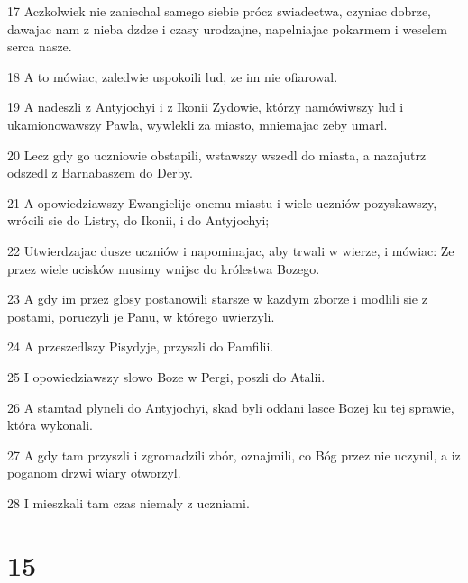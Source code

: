 \par 17 Aczkolwiek nie zaniechal samego siebie prócz swiadectwa, czyniac dobrze, dawajac nam z nieba dzdze i czasy urodzajne, napelniajac pokarmem i weselem serca nasze.
\par 18 A to mówiac, zaledwie uspokoili lud, ze im nie ofiarowal.
\par 19 A nadeszli z Antyjochyi i z Ikonii Zydowie, którzy namówiwszy lud i ukamionowawszy Pawla, wywlekli za miasto, mniemajac zeby umarl.
\par 20 Lecz gdy go uczniowie obstapili, wstawszy wszedl do miasta, a nazajutrz odszedl z Barnabaszem do Derby.
\par 21 A opowiedziawszy Ewangielije onemu miastu i wiele uczniów pozyskawszy, wrócili sie do Listry, do Ikonii, i do Antyjochyi;
\par 22 Utwierdzajac dusze uczniów i napominajac, aby trwali w wierze, i mówiac: Ze przez wiele ucisków musimy wnijsc do królestwa Bozego.
\par 23 A gdy im przez glosy postanowili starsze w kazdym zborze i modlili sie z postami, poruczyli je Panu, w którego uwierzyli.
\par 24 A przeszedlszy Pisydyje, przyszli do Pamfilii.
\par 25 I opowiedziawszy slowo Boze w Pergi, poszli do Atalii.
\par 26 A stamtad plyneli do Antyjochyi, skad byli oddani lasce Bozej ku tej sprawie, która wykonali.
\par 27 A gdy tam przyszli i zgromadzili zbór, oznajmili, co Bóg przez nie uczynil, a iz poganom drzwi wiary otworzyl.
\par 28 I mieszkali tam czas niemaly z uczniami.

\chapter{15}

